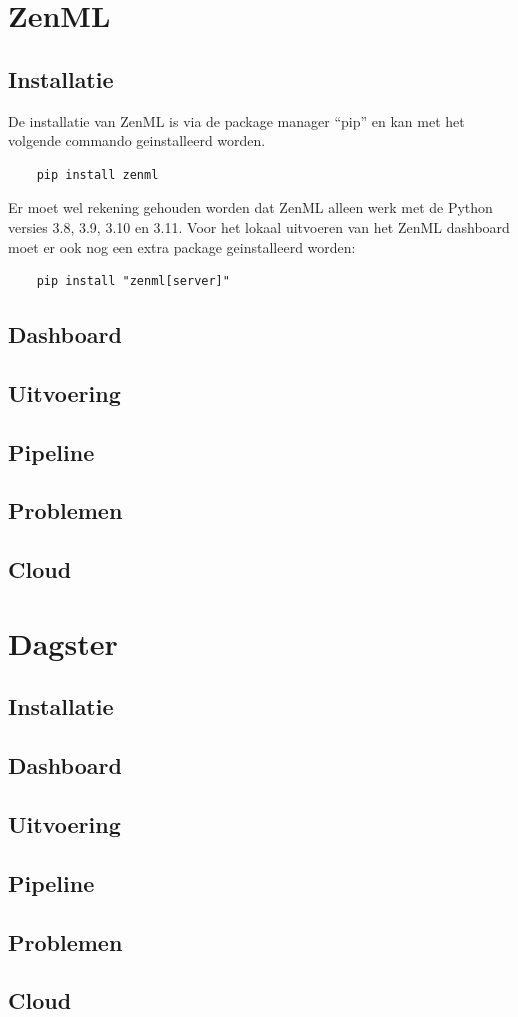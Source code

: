 \section{ZenML}
\subsection{Installatie}
De installatie van ZenML is via de package manager ``pip'' en kan met het volgende commando geinstalleerd worden.
\begin{verbatim}
    pip install zenml
\end{verbatim}
Er moet wel rekening gehouden worden dat ZenML alleen werk met de Python versies 3.8, 3.9, 3.10 en 3.11.
Voor het lokaal uitvoeren van het ZenML dashboard moet er ook nog een extra package geinstalleerd worden:
\begin{verbatim}
    pip install "zenml[server]"
\end{verbatim}
\subsection{Dashboard}
\subsection{Uitvoering}
\subsection{Pipeline}
\subsection{Problemen}
\subsection{Cloud}
\section{Dagster}
\subsection{Installatie}
\subsection{Dashboard}
\subsection{Uitvoering}
\subsection{Pipeline}
\subsection{Problemen}
\subsection{Cloud}


